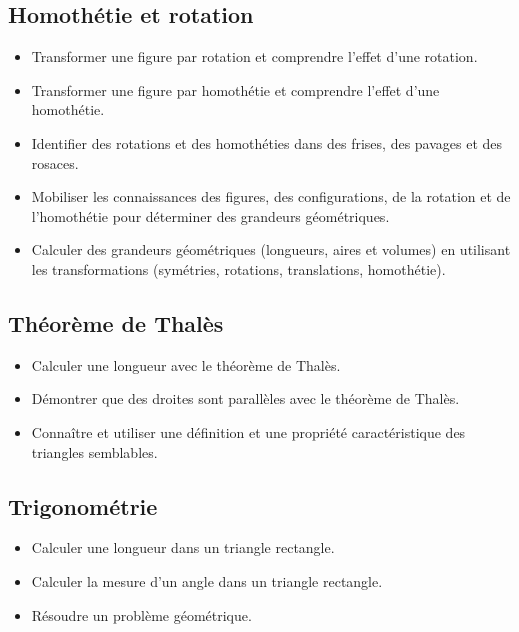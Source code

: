 \documentclass[a4paper,12pt,fleqn]{article}
\begin{document}
\renewcommand{\labelitemi}{}

\subsection*{Homothétie et rotation}

\begin{itemize}
	\item {}Transformer une figure par rotation et comprendre l’effet d’une rotation.
	\item {}Transformer une figure par homothétie et comprendre l’effet d’une homothétie.
	\item {}Identifier des rotations et des homothéties dans des frises, des pavages et des rosaces.
	\item {}Mobiliser les connaissances des figures, des configurations, de la rotation et de l’homothétie pour déterminer des grandeurs géométriques.
	\item {}Calculer des grandeurs géométriques (longueurs, aires et volumes) en utilisant les transformations (symétries, rotations, translations, homothétie).
	

\end{itemize}

\subsection*{Théorème de Thalès}

\begin{itemize}
	\item {}Calculer une longueur avec le théorème de Thalès.
	\item {}Démontrer que des droites sont parallèles avec le théorème de Thalès.
	\item {}Connaître et utiliser une définition et une propriété caractéristique des triangles semblables.
\end{itemize}


\subsection*{Trigonométrie}

\begin{itemize}
	\item {}Calculer une longueur dans un triangle rectangle.
	\item {}Calculer la mesure d'un angle dans un triangle rectangle.
	\item {}Résoudre un problème géométrique.
\end{itemize}
\end{document}
